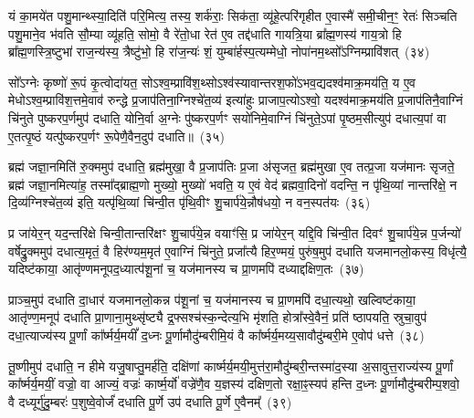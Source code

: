 यं का॒मये॑त पशु॒मान्थ्स्या॒दिति॑ परि॒मित्य॒ तस्य॒ शर्क॑राः॒ सिक॑ता॒ व्यू॑हे॒त्परि॑गृहीत ए॒वास्मै॑ समी॒चीन॒ꣳ॒ रेतः॑ सिञ्चति पशु॒माने॒व भ॑वति सौ॒म्या व्यू॑हति॒ सोमो॒ वै रे॑तो॒धा रेत॑ ए॒व तद्द॑धाति गायत्रि॒या ब्रा᳚ह्म॒णस्य॑ गाय॒त्रो हि ब्रा᳚ह्म॒णस्त्रि॒ष्टुभा॑ राज॒न्य॑स्य॒ त्रैष्टु॑भो॒ हि रा॑ज॒न्यः॑ शं॒ युम्बा॑र्\mbox{}हस्प॒त्यम्मेधो॒ नोपा॑नम॒थ्सो᳚\-ऽग्निम्प्रावि॑शत्~(३४)

सो᳚\-ऽग्नेः कृष्णो॑ रू॒पं कृ॒त्वोदा॑यत॒ सो\-ऽश्व॒म्प्रावि॑श॒थ्सो\-ऽश्व॑स्यावान्तरश॒फो॑\-ऽभव॒द्यदश्व॑माक्र॒मय॑ति॒ य ए॒व मेधो\-ऽश्व॒म्प्रावि॑श॒त्तमे॒वाव॑ रुन्द्धे प्र॒जाप॑तिना॒ग्निश्चे॑त॒व्य॑ इत्या॑हुः प्राजाप॒त्यो\-ऽश्वो॒ यदश्व॑माक्र॒मय॑ति प्र॒जाप॑तिनै॒वाग्निं चि॑नुते पुष्करप॒र्णमुप॑ दधाति॒ योनि॒र्वा अ॒ग्नेः पु॑ष्करप॒र्णꣳ सयो॑निमे॒वाग्निं चि॑नुते॒\-ऽपां पृ॒ष्ठम॒सीत्युप॑ दधात्य॒पां वा ए॒तत्पृ॒ष्ठं यत्पु॑ष्करप॒र्णꣳ रू॒पेणै॒वैन॒दुप॑ दधाति॥~(३५)

{\anuvakamend[{इन्द्रः॑ प॒शुका॑मस्य भवत्यविश॒थ्सयो॑निं विꣳश॒तिश्च॑}]}%

ब्रह्म॑ जज्ञा॒नमिति॑ रु॒क्ममुप॑ दधाति॒ ब्रह्म॑मुखा॒ वै प्र॒जाप॑तिः प्र॒जा अ॑सृजत॒ ब्रह्म॑मुखा ए॒व तत्प्र॒जा यज॑मानः सृजते॒ ब्रह्म॑ जज्ञा॒नमित्या॑ह॒ तस्मा᳚द्ब्राह्म॒णो मुख्यो॒ मुख्यो॑ भवति॒ य ए॒वं वेद॑ ब्रह्मवा॒दिनो॑ वदन्ति॒ न पृ॑थि॒व्यां नान्तरि॑क्षे॒ न दि॒व्य॑ग्निश्चे॑त॒व्य॑ इति॒ यत्पृ॑थि॒व्यां चि॑न्वी॒त पृ॑थि॒वीꣳ शु॒चार्प॑ये॒न्नौष॑धयो॒ न वन॒स्पत॑यः~(३६)

प्र जा॑येर॒न् यद॒न्तरि॑क्षे चिन्वी॒तान्तरि॑क्षꣳ शु॒चार्प॑ये॒न्न वयाꣳ॑सि॒ प्र जा॑येर॒न् यद्दि॒वि चि॑न्वी॒त दिवꣳ॑ शु॒चार्प॑ये॒न्न प॒र्जन्यो॑ वर्\mbox{}षेद्रु॒क्ममुप॑ दधात्य॒मृतं॒ वै हिर॑ण्यम॒मृत॑ ए॒वाग्निं चि॑नुते॒ प्रजा᳚त्यै हिर॒ण्मयं॒ पुरु॑ष॒मुप॑ दधाति यजमानलो॒कस्य॒ विधृ॑त्यै॒ यदिष्ट॑काया॒ आतृ॑ण्णमनूपद॒ध्यात्प॑शू॒नां च॒ यज॑मानस्य च प्रा॒णमपि॑ दध्याद्दक्षिण॒तः~(३७)

प्राञ्च॒मुप॑ दधाति दा॒धार॑ यजमानलो॒कन्न प॑शू॒नां च॒ यज॑मानस्य च प्रा॒णमपि॑ दधा॒त्यथो॒ खल्विष्ट॑काया॒ आतृ॑ण्ण॒मनूप॑ दधाति प्रा॒णाना॒मुथ्सृ॑ष्ट्यै द्र॒फ्सश्च॑स्क॒न्देत्य॒भि मृ॑शति॒ होत्रा᳚स्वे॒वैनं॒ प्रति॑ ष्ठापयति॒ स्रुचा॒वुप॑ दधा॒त्याज्य॑स्य पू॒र्णां का᳚र्ष्मर्य॒मयीं᳚ द॒ध्नः पू॒र्णामौदु॑म्बरीमि॒यं वै का᳚र्ष्मर्य॒मय्य॒सावौदु॑म्बरी॒मे ए॒वोप॑ धत्ते~(३८)

तू॒ष्णीमुप॑ दधाति॒ न हीमे यजु॒षाप्तु॒मर्\mbox{}ह॑ति॒ दक्षि॑णां कार्ष्मर्य॒मयी॒मुत्त॑रा॒मौदु॑म्बरी॒न्तस्मा॑द॒स्या अ॒सावुत्त॒राज्य॑स्य पू॒र्णां का᳚र्ष्मर्य॒मयीं॒ वज्रो॒ वा आज्यं॒ वज्रः॑ कार्ष्म॒र्यो॑ वज्रे॑णै॒व य॒ज्ञस्य॑ दक्षिण॒तो रक्षा॒ꣴ॒स्यप॑ हन्ति द॒ध्नः पू॒र्णामौदु॑म्बरीम्प॒शवो॒ वै दध्यूर्गु॑दु॒म्बरः॑ प॒शुष्वे॒वोर्जं॑ दधाति पू॒र्णे उप॑ दधाति पू॒र्णे ए॒वैनम्᳚~(३९)

